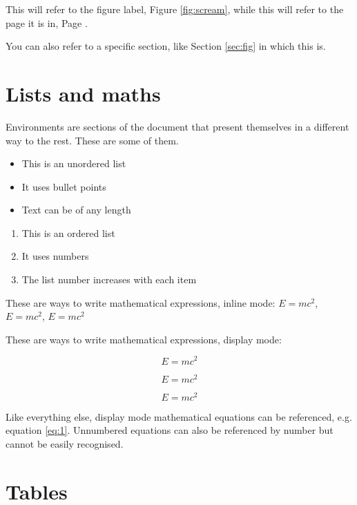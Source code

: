 \documentclass[12pt, letterpaper]{article} %
\begin{document}
This will refer to the figure label, Figure \ref{fig:scream}, 
while this will refer to the page it is in, Page \pageref{fig:scream}.

You can also refer to a specific section, 
like Section \ref{sec:fig} in which this is.

\clearpage
\section{Lists and maths}
Environments are sections of the document that present themselves 
in a different way to the rest. These are some of them.

\begin{itemize}
  \item This is an unordered list
  \item It uses bullet points
  \item Text can be of any length
\end{itemize}

\begin{enumerate}
  \item This is an ordered list
  \item It uses numbers
  \item The list number increases with each item
\end{enumerate}

These are ways to write mathematical expressions, inline mode:
$E=mc^2$, 
\(E=mc^2\), 
\begin{math} E=mc^2 \end{math}

These are ways to write mathematical expressions, display mode:

\begin{equation} \label{eq:1} %
E=mc^2
\end{equation}

\[E=mc^2\] %

\begin{displaymath} %
E=mc^2
\end{displaymath}


Like everything else, display mode mathematical equations 
can be referenced, e.g. equation \ref{eq:1}. 
Unnumbered equations can also be referenced by number 
but cannot be easily recognised.

\clearpage
\section{Tables} %
\end{document}
